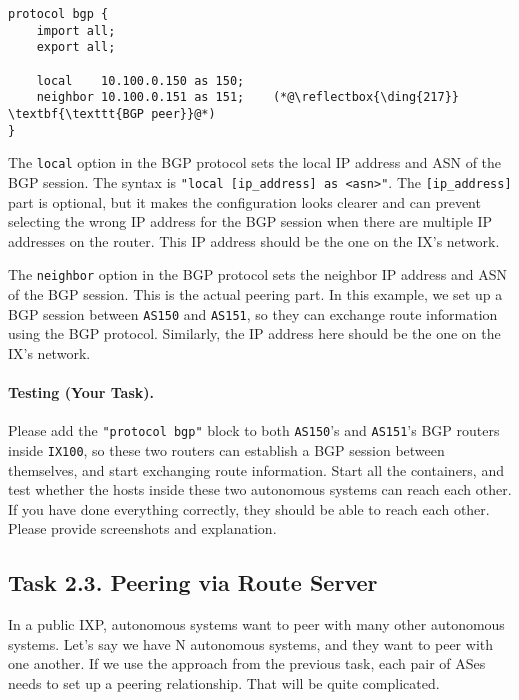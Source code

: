 \begin{lstlisting}
protocol bgp {        
    import all; 
    export all;

    local    10.100.0.150 as 150;
    neighbor 10.100.0.151 as 151;    (*@\reflectbox{\ding{217}} \textbf{\texttt{BGP peer}}@*) 
}
\end{lstlisting}

The \texttt{local} option in the BGP protocol sets the local IP address and ASN of the BGP session.
The syntax is \texttt{"local [ip\_address] as <asn>"}. The \texttt{[ip\_address]} part is optional,
but it makes the configuration looks clearer and can prevent selecting the wrong IP address for the
BGP session when there are multiple IP addresses on the router. This 
IP address should be the one on the IX's network. 

The \texttt{neighbor} option in the BGP protocol sets the neighbor IP address and ASN of the BGP
session. This is the actual peering part. In this example, we set up a BGP session
between \texttt{AS150} and \texttt{AS151}, so they can exchange route information using the BGP protocol. 
Similarly, the IP address here should be the one on the IX's network. 


\paragraph{Testing (Your Task).} Please add the \texttt{"protocol bgp"} block to both \texttt{AS150}'s
and \texttt{AS151}'s BGP routers inside \texttt{IX100}, so these two routers 
can establish a BGP session between themselves, and start exchanging route information. 
Start all the containers, and test whether the hosts inside these two
autonomous systems can reach each other. If you have done everything correctly, they
should be able to reach each other.
Please provide screenshots and explanation.



\subsection{Task 2.3. Peering via Route Server} 


In a public IXP, autonomous systems want to peer with many other autonomous systems.
Let's say we have N autonomous systems, and they want to peer with one another. 
If we use the approach from the previous task, each pair of ASes needs 
to set up a peering relationship. That will be quite complicated. 

